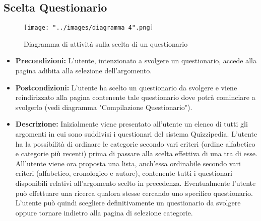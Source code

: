 \subsection{Scelta Questionario}
\begin{figure}[h!]
\begin{center}
	\texttt{[image: "../images/diagramma 4".png]}
	\caption{Diagramma di attività sulla scelta di un questionario}
\end{center}
\end{figure}
\begin{itemize}
\item\textbf{Precondizioni:} L'utente, intenzionato a svolgere un questionario, accede alla pagina adibita alla selezione dell'argomento.
\item\textbf{Postcondizioni:} L'utente ha scelto un questionario da svolgere e viene reindirizzato alla pagina contenente tale questionario dove potrà cominciare a svolgerlo (vedi diagramma "Compilazione Questionario").
\item\textbf{Descrizione:} Inizialmente viene presentato all'utente un elenco di tutti gli argomenti in cui sono suddivisi i questionari del sistema Quizzipedia. L'utente ha la possibilità di ordinare le categorie secondo vari criteri (ordine alfabetico e categorie più recenti) prima di passare alla scelta effettiva di una tra di esse. All'utente viene ora proposta una lista, anch'essa ordinabile secondo vari criteri (alfabetico, cronologico e autore), contenente tutti i questionari disponibili relativi all'argomento scelto in precedenza. Eventualmente l'utente può effettuare una ricerca qualora stesse cercando uno specifico questionario. L'utente può quindi scegliere definitivamente un questionario da svolgere oppure tornare indietro alla pagina di selezione categorie.
\end{itemize}
\newpage